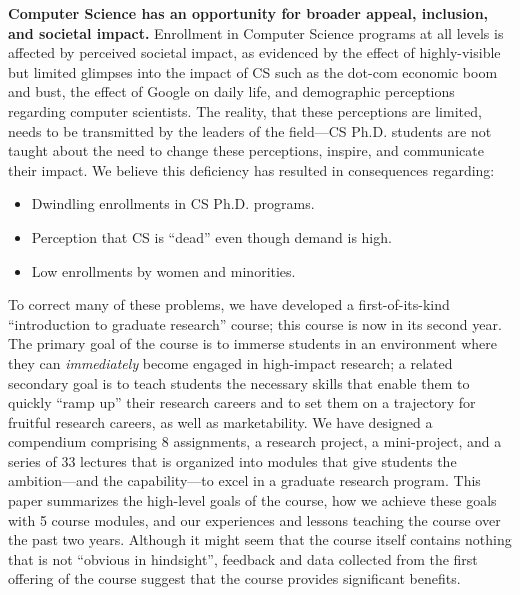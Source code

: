 {\bf Computer Science has an opportunity for broader appeal,
  inclusion, and societal impact.}  Enrollment in Computer Science
  programs at all levels is affected by perceived societal impact, as
  evidenced by the effect of highly-visible but limited glimpses into
  the impact of CS such as the dot-com economic boom and bust, the
  effect of Google on daily life, and demographic perceptions
  regarding computer scientists.  The reality, that these perceptions
  are limited, needs to be transmitted by the leaders of the field---CS
  Ph.D. students are not taught about the need to change these
  perceptions, inspire, and communicate their impact.  We believe
  this deficiency has resulted in consequences regarding:
  \begin{itemize}
\itemsep=-1pt
  \item Dwindling enrollments in CS Ph.D. programs.
  \item Perception that CS is ``dead'' even though demand is high.
  \item Low enrollments by women and minorities.
  \end{itemize}

To correct many of these problems, we have developed a first-of-its-kind
``introduction to graduate research'' course; this course is now in its
second year.  The primary goal of the course is to immerse students in
an environment where they can {\em immediately} become engaged in
high-impact research; a related secondary goal is to teach students the
necessary skills that enable them to quickly ``ramp up'' their research
careers and to set them on a trajectory for fruitful research careers,
as well as marketability.  We have designed a compendium comprising 8
assignments, a research project, a mini-project, and a series of 33
lectures that is organized into modules that give students the
ambition---and the capability---to excel in a graduate research program.
This paper summarizes the high-level goals of the course, how we achieve
these goals with 5 course modules, and our experiences and lessons
teaching the course over the past two years.  Although it might seem
that the course itself contains nothing that is not ``obvious in
hindsight'', feedback and data collected from the first offering of the
course suggest that the course provides significant benefits.



